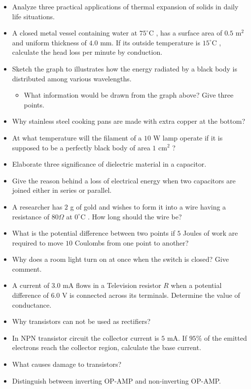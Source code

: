 \documentclass{article}
\begin{document}
\begin{itemize}
\item Analyze  three practical applications of thermal expansion of solids in daily life situations.
\item A closed metal vessel containing water at $ 75^{\circ}$C , has a surface area of $ 0.5$ m$ ^{2}$ and uniform thickness of $ 4.0$ mm.  If its outside temperature is $ 15^{\circ}$C , calculate the head loss per minute by conduction.
\item Sketch the graph to illustrates how the energy radiated by a black body is distributed among various wavelengths. 
 \begin{itemize}
\item What information would be drawn from the graph above? Give three points.
\end{itemize}
\item Why stainless steel cooking pans are made with extra copper at the bottom?
\item At what temperature will the filament of a $ 10$ W lamp operate if it is supposed to be a perfectly black body of area  $ 1 $ cm$ ^{2}$ ? 
\item Elaborate three significance of dielectric material in a capacitor. 
\item Give the reason behind a loss of electrical energy when two capacitors are joined either in series or parallel. 
\item A researcher has $ 2$ g of gold and wishes to form it into a wire having a resistance of $ 80\Omega $ at $ 0^{\circ}$C . How long should the wire be? 
\item What is the potential difference between two points if $ 5$ Joules of work are required to move $ 10$ Coulombs from one point to another? 
\item Why does a room light turn on at once when the switch is closed? Give comment.
\item A current of $ 3.0$ mA flows in a Television resistor $ R$ when a potential difference of $ 6.0$ V is connected across its terminals. Determine the value of conductance.
\item Why transistors can not be used as rectifiers? 
\item In NPN transistor circuit the collector current is $ 5$ mA. If $ 95\%$ of the emitted electrons reach the collector region, calculate the base current. 
\item What causes damage to transistors? 
\item Distinguish between inverting OP-AMP and non-inverting OP-AMP. 
 \begin{itemize}

\end{itemize}
\end{itemize}
\end{document}
